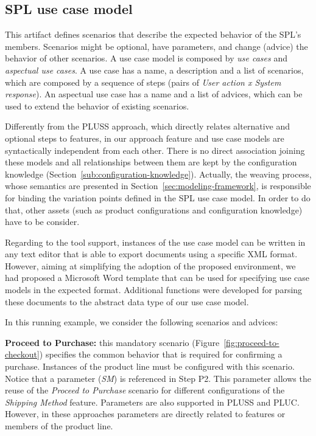 \documentclass{acm_proc_article-sp}
\begin{document}
\subsection{SPL use case model}\label{sub:spl-uc}

This artifact defines scenarios that describe the expected behavior of the SPL's
members. Scenarios might be optional, have parameters, and change (advice) the
behavior of other scenarios. A use case model is composed by \emph{use cases} and
\emph{aspectual use cases}. A use case has a name, a description and a list of
scenarios, which are composed by a sequence of steps (pairs of \emph{User action x
System response}). An aspectual use case has a name and a list of advices, which
can be used to extend the behavior of existing scenarios.

Differently from the PLUSS approach, which directly relates alternative and
optional steps to features, in our approach {\color{red}feature and use case
models are syntactically independent from each other. There is no direct
association joining these models and all relationships between them are kept by
the configuration knowledge (Section~\ref{sub:configuration-knowledge}).}
 {\color{red} Actually, the weaving process, whose semantics are presented in
 Section~\ref{sec:modeling-framework}, is responsible for binding the variation
 points defined in the SPL use case model. In order to do that, other assets
 (such as product configurations and configuration knowledge) have to be
 consider.}

{\color{red} Regarding to the tool support, instances of the use case model can
be written in any text editor that is able to export documents using a specific
XML format. However, aiming at simplifying the adoption of the proposed
environment, we had proposed a Microsoft Word template that can be used for
specifying use case models in the expected format. Additional functions were
developed for parsing these documents to the abstract data type of our use case
model.}

In this running example, we consider the following scenarios and advices:

{\bf Proceed to Purchase:} this mandatory scenario
(Figure~\ref{fig:proceed-to-checkout}) specifies the common behavior that is
required for confirming a purchase. Instances of the product line must be
configured with this scenario. 
Notice that a parameter (\emph{SM}) is referenced in Step P2. 
This parameter allows the reuse of the \emph{Proceed to
Purchase} scenario for different configurations of the \emph{Shipping Method} feature. {\color{red} Parameters 
are also supported in PLUSS and PLUC. However, in these approaches parameters are directly related to features or members of the product line.}
\end{document}
